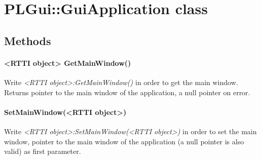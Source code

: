 \section{PLGui::GuiApplication class}


\subsection{Methods}

\paragraph{<RTTI object> GetMainWindow()}
Write \emph{<RTTI object>:GetMainWindow()} in order to get the main window. Returns pointer to the main window of the application, a null pointer on error.

\paragraph{SetMainWindow(<RTTI object>)}
Write \emph{<RTTI object>:SetMainWindow(<RTTI object>)} in order to set the main window, pointer to the main window of the application (a null pointer is also valid) as first parameter.
